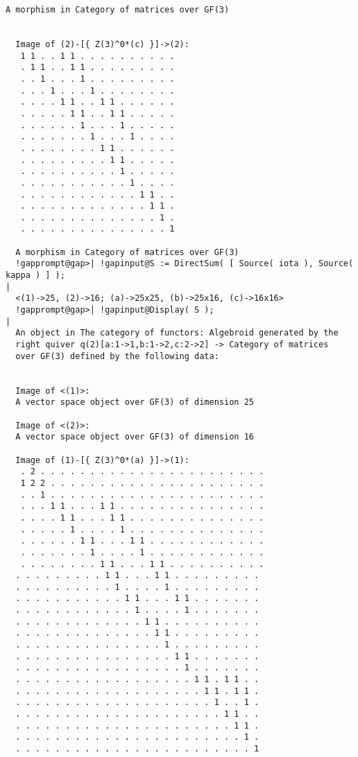 \begin{computation}
\begin{Verbatim}[commandchars=!@|,fontsize=\small,frame=single,label=Example]
  A morphism in Category of matrices over GF(3)
  
  
  Image of (2)-[{ Z(3)^0*(c) }]->(2):
   1 1 . . 1 1 . . . . . . . . . .
   . 1 1 . . 1 1 . . . . . . . . .
   . . 1 . . . 1 . . . . . . . . .
   . . . 1 . . . 1 . . . . . . . .
   . . . . 1 1 . . 1 1 . . . . . .
   . . . . . 1 1 . . 1 1 . . . . .
   . . . . . . 1 . . . 1 . . . . .
   . . . . . . . 1 . . . 1 . . . .
   . . . . . . . . 1 1 . . . . . .
   . . . . . . . . . 1 1 . . . . .
   . . . . . . . . . . 1 . . . . .
   . . . . . . . . . . . 1 . . . .
   . . . . . . . . . . . . 1 1 . .
   . . . . . . . . . . . . . 1 1 .
   . . . . . . . . . . . . . . 1 .
   . . . . . . . . . . . . . . . 1
  
  A morphism in Category of matrices over GF(3)
  !gapprompt@gap>| !gapinput@S := DirectSum( [ Source( iota ), Source( kappa ) ] );
|
  <(1)->25, (2)->16; (a)->25x25, (b)->25x16, (c)->16x16>
  !gapprompt@gap>| !gapinput@Display( S );
|
  An object in The category of functors: Algebroid generated by the
  right quiver q(2)[a:1->1,b:1->2,c:2->2] -> Category of matrices
  over GF(3) defined by the following data:
  
  
  Image of <(1)>:
  A vector space object over GF(3) of dimension 25
  
  Image of <(2)>:
  A vector space object over GF(3) of dimension 16
  
  Image of (1)-[{ Z(3)^0*(a) }]->(1):
   . 2 . . . . . . . . . . . . . . . . . . . . . . .
   1 2 2 . . . . . . . . . . . . . . . . . . . . . .
   . . 1 . . . . . . . . . . . . . . . . . . . . . .
   . . . 1 1 . . . 1 1 . . . . . . . . . . . . . . .
   . . . . 1 1 . . . 1 1 . . . . . . . . . . . . . .
   . . . . . 1 . . . . 1 . . . . . . . . . . . . . .
   . . . . . . 1 1 . . . 1 1 . . . . . . . . . . . .
   . . . . . . . 1 . . . . 1 . . . . . . . . . . . .
   . . . . . . . . 1 1 . . . 1 1 . . . . . . . . . .
  . . . . . . . . . 1 1 . . . 1 1 . . . . . . . . .
  . . . . . . . . . . 1 . . . . 1 . . . . . . . . .
  . . . . . . . . . . . 1 1 . . . 1 1 . . . . . . .
  . . . . . . . . . . . . 1 . . . . 1 . . . . . . .
  . . . . . . . . . . . . . 1 1 . . . . . . . . . .
  . . . . . . . . . . . . . . 1 1 . . . . . . . . .
  . . . . . . . . . . . . . . . 1 . . . . . . . . .
  . . . . . . . . . . . . . . . . 1 1 . . . . . . .
  . . . . . . . . . . . . . . . . . 1 . . . . . . .
  . . . . . . . . . . . . . . . . . . 1 1 . 1 1 . .
  . . . . . . . . . . . . . . . . . . . 1 1 . 1 1 .
  . . . . . . . . . . . . . . . . . . . . 1 . . 1 .
  . . . . . . . . . . . . . . . . . . . . . 1 1 . .
  . . . . . . . . . . . . . . . . . . . . . . 1 1 .
  . . . . . . . . . . . . . . . . . . . . . . . 1 .
  . . . . . . . . . . . . . . . . . . . . . . . . 1
  

\end{Verbatim}
\end{computation}
